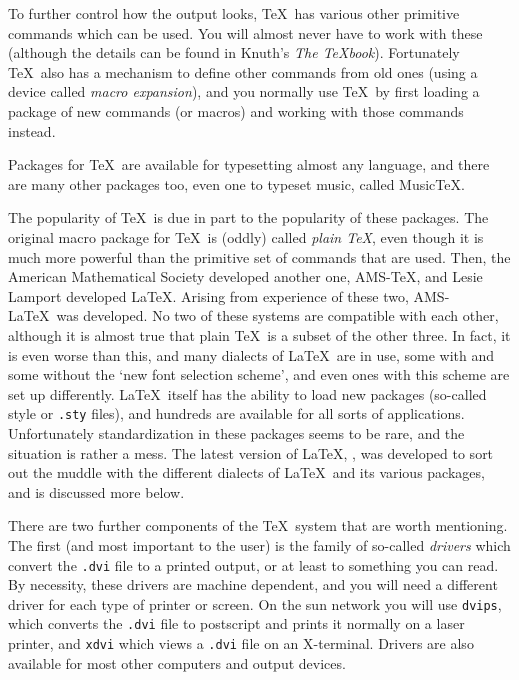 \documentclass[11pt,a4paper]{article}
\newcommand{\fn}[1]{{\tt #1}}
\begin{document}
To further control how the output looks, \TeX~has various 
other primitive commands which can be used. You will almost never
have to work with these (although the details can be found in 
Knuth's {\it The \TeX book}).  Fortunately \TeX\ also has a mechanism to
define other commands from old ones (using a device called {\it 
macro expansion\/}), and you normally use \TeX~by first loading
a package of new commands (or macros) and working with those commands 
instead.

Packages for \TeX\ are available for typesetting almost any language,
and there are many other packages too, even one to typeset music, called
Music\TeX.

The popularity of \TeX\ is due in part to the popularity of these
packages. The original macro package for \TeX\ is (oddly) called
{\it plain \TeX\/}, even though it is much more powerful than the
primitive set of commands that are used.  Then, the American Mathematical 
Society developed another one, AMS-\TeX, and Lesie Lamport developed
\LaTeX. Arising from experience of these two, AMS-\LaTeX~was developed.
No two of these systems are compatible with each other, although
it is almost true that plain \TeX\ is a subset of the other three.
In fact, it is even worse than this, and many dialects of \LaTeX\
are in use, some with and some without the `new font selection scheme',
and even ones with this scheme are set up differently.
\LaTeX\ itself has the ability to load new packages (so-called 
style or \fn{.sty} files), and hundreds are available for all sorts of
applications.  Unfortunately standardization in these packages seems
to be rare, and the situation is rather a mess.  The latest version 
of \LaTeX, \LaTeXe, was developed to sort out the muddle with the different
dialects of \LaTeX\ and its various packages, and is discussed more below.

There are two further components of the \TeX~system that are worth 
mentioning.  The first (and most important to the user) is the family
of so-called {\it drivers\/} which convert the \fn{.dvi} file to a
printed output, or at least to something you can read.  By necessity,
these drivers are machine dependent, and you will need a different driver
for each type of printer or screen.  On the sun
network you will use \fn{dvips}, which converts the \fn{.dvi} file
to postscript and prints it normally on a laser printer, 
and \fn{xdvi} which views a \fn{.dvi}
file on an X-terminal.  Drivers are also available for most other
computers and output devices.
\end{document}
